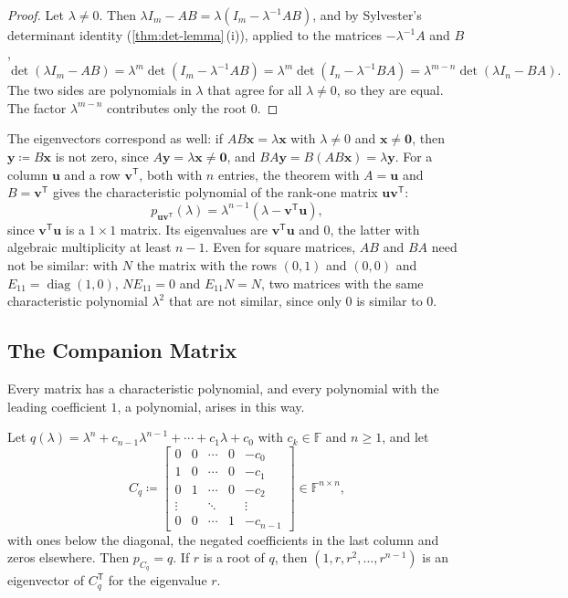 \begin{proof}
Let $\lambda\ne0$. Then $\lambda I_m-AB=\lambda(I_m-\lambda^{-1}AB)$, and by Sylvester's determinant identity (\cref{thm:det-lemma}\,(i)), applied to the matrices $-\lambda^{-1}A$ and $B$,
\[
\det(\lambda I_m-AB)=\lambda^m\det(I_m-\lambda^{-1}AB)=\lambda^m\det(I_n-\lambda^{-1}BA)=\lambda^{m-n}\det(\lambda I_n-BA).
\]
The two sides are polynomials in $\lambda$ that agree for all $\lambda\ne0$, so they are equal. The factor $\lambda^{m-n}$ contributes only the root $0$.
\end{proof}

The eigenvectors correspond as well: if $AB\mathbf x=\lambda\mathbf x$ with $\lambda\ne0$ and $\mathbf x\ne\mathbf 0$, then $\mathbf y\coloneqq B\mathbf x$ is not zero, since $A\mathbf y=\lambda\mathbf x\ne\mathbf 0$, and $BA\mathbf y=B(AB\mathbf x)=\lambda\mathbf y$. For a column $\mathbf u$ and a row $\mathbf v^{\mathsf T}$, both with $n$ entries, the theorem with $A=\mathbf u$ and $B=\mathbf v^{\mathsf T}$ gives the characteristic polynomial of the rank-one matrix $\mathbf u\mathbf v^{\mathsf T}$:
\[
p_{\mathbf u\mathbf v^{\mathsf T}}(\lambda)=\lambda^{n-1}(\lambda-\mathbf v^{\mathsf T}\mathbf u),
\]
since $\mathbf v^{\mathsf T}\mathbf u$ is a $1\times1$ matrix. Its eigenvalues are $\mathbf v^{\mathsf T}\mathbf u$ and $0$, the latter with algebraic multiplicity at least $n-1$. Even for square matrices, $AB$ and $BA$ need not be similar: with $N$ the matrix with the rows $(0,1)$ and $(0,0)$ and $E_{11}=\operatorname{diag}(1,0)$, $NE_{11}=0$ and $E_{11}N=N$, two matrices with the same characteristic polynomial $\lambda^2$ that are not similar, since only $0$ is similar to $0$.

\subsection{The Companion Matrix}

Every matrix has a characteristic polynomial, and every polynomial with the leading coefficient $1$, a  polynomial, arises in this way.

\begin{proposition}
\label{prop:companion}
Let $q(\lambda)=\lambda^n+c_{n-1}\lambda^{n-1}+\cdots+c_1\lambda+c_0$ with $c_k\in\mathbb F$ and $n\ge1$, and let
\[
C_q\coloneqq\begin{bmatrix}0&0&\cdots&0&-c_0\\1&0&\cdots&0&-c_1\\0&1&\cdots&0&-c_2\\\vdots&&\ddots&&\vdots\\0&0&\cdots&1&-c_{n-1}\end{bmatrix}\in\mathbb F^{n\times n},
\]
with ones below the diagonal, the negated coefficients in the last column and zeros elsewhere. Then $p_{C_q}=q$. If $r$ is a root of $q$, then $(1,r,r^2,\ldots,r^{n-1})$ is an eigenvector of $C_q^{\mathsf T}$ for the eigenvalue $r$.
\end{proposition}

